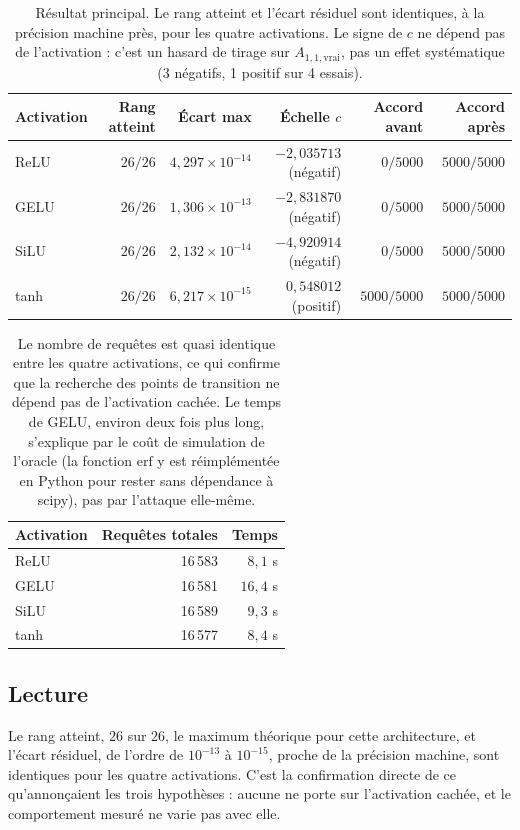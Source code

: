 \documentclass[11pt]{article}
\begin{document}
\begin{table}[h]
\centering
\begin{tabular}{lrrrrr}
\toprule
Activation & Rang atteint & Écart max & Échelle $c$ & Accord avant & Accord après \\
\midrule
ReLU  & $26/26$ & $4{,}297 \times 10^{-14}$ & $-2{,}035713$ (négatif) & $0/5000$ & $5000/5000$ \\
GELU  & $26/26$ & $1{,}306 \times 10^{-13}$ & $-2{,}831870$ (négatif) & $0/5000$ & $5000/5000$ \\
SiLU  & $26/26$ & $2{,}132 \times 10^{-14}$ & $-4{,}920914$ (négatif) & $0/5000$ & $5000/5000$ \\
tanh  & $26/26$ & $6{,}217 \times 10^{-15}$ & $0{,}548012$ (positif)  & $5000/5000$ & $5000/5000$ \\
\bottomrule
\end{tabular}
\caption{Résultat principal. Le rang atteint et l'écart résiduel sont
identiques, à la précision machine près, pour les quatre activations. Le
signe de $c$ ne dépend pas de l'activation : c'est un hasard de tirage sur
$A_{1,1,\text{vrai}}$, pas un effet systématique (3 négatifs, 1 positif sur
4 essais).}
\end{table}

\begin{table}[h]
\centering
\begin{tabular}{lrr}
\toprule
Activation & Requêtes totales & Temps \\
\midrule
ReLU & 16\,583 & $8{,}1$ s \\
GELU & 16\,581 & $16{,}4$ s \\
SiLU & 16\,589 & $9{,}3$ s \\
tanh & 16\,577 & $8{,}4$ s \\
\bottomrule
\end{tabular}
\caption{Le nombre de requêtes est quasi identique entre les quatre
activations, ce qui confirme que la recherche des points de transition ne
dépend pas de l'activation cachée. Le temps de GELU, environ deux fois plus
long, s'explique par le coût de simulation de l'oracle (la fonction
$\mathrm{erf}$ y est réimplémentée en Python pour rester sans dépendance à
scipy), pas par l'attaque elle-même.}
\end{table}

\subsection*{Lecture}

Le rang atteint, $26$ sur $26$, le maximum théorique pour cette
architecture, et l'écart résiduel, de l'ordre de $10^{-13}$ à $10^{-15}$,
proche de la précision machine, sont identiques pour les quatre
activations. C'est la confirmation directe de ce qu'annonçaient les trois
hypothèses : aucune ne porte sur l'activation cachée, et le comportement
mesuré ne varie pas avec elle.
\end{document}
